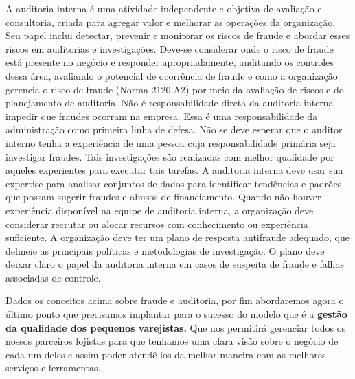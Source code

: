 \documentclass[a4paper]{article}
\begin{document}
\begin{itemize}
    \par A auditoria interna é uma atividade independente e objetiva de avaliação e consultoria, criada para agregar valor e melhorar as operações da organização. Seu papel inclui detectar, prevenir e monitorar os riscos de fraude e abordar esses riscos em auditorias e investigações. Deve-se considerar onde o risco de fraude está presente no negócio e responder apropriadamente, auditando os controles dessa área, avaliando o potencial de ocorrência de fraude e como a organização gerencia o risco de fraude (Norma 2120.A2) por meio da avaliação de riscos e do planejamento de auditoria. Não é responsabilidade direta da auditoria interna impedir que fraudes ocorram na empresa. Essa é uma responsabilidade da administração como primeira linha de defesa. Não se deve esperar que o auditor interno tenha a experiência de uma pessoa cuja responsabilidade primária seja investigar fraudes. Tais investigações são realizadas com melhor qualidade por aqueles experientes para executar tais tarefas. A auditoria interna deve usar sua expertise para analisar conjuntos de dados para identificar tendências e padrões que possam sugerir fraudes e abusos de financiamento. Quando não houver experiência disponível na equipe de auditoria interna, a organização deve considerar recrutar ou alocar recursos com conhecimento ou experiência suficiente. A organização deve ter um plano de resposta antifraude adequado, que delineie as principais políticas e metodologias de investigação. O plano deve deixar claro o papel da auditoria interna em casos de suspeita de fraude e falhas associadas de controle.
\end{itemize}
\par Dados os conceitos acima sobre fraude e auditoria, por fim abordaremos agora o último ponto que precisamos implantar para o sucesso do modelo que é a  \textbf{gestão da qualidade dos pequenos varejistas.} Que nos permitirá gerenciar todos os nossos parceiros lojistas para que tenhamos uma clara visão sobre o negócio de cada um deles e assim poder atendê-los da melhor maneira com as melhores serviços e ferramentas. 
\end{document}
